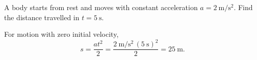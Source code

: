 

\makematerialtitle

\begin{problem}
A body starts from rest and moves with constant acceleration
$a=\SI{2}{\metre\per\second\squared}$. Find the distance travelled in $t=\SI{5}{\second}$.
\begin{solution}
For motion with zero initial velocity,
\[
  s = \frac{at^2}{2}
    = \frac{\SI{2}{\metre\per\second\squared}\,(\SI{5}{\second})^2}{2}
    = \SI{25}{\metre}.
\]
\end{solution}
\end{problem}


